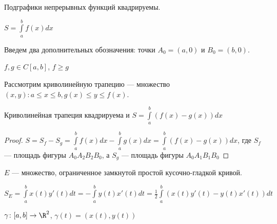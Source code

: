     \begin{Rem}

        Подграфики непрерывных функций квадрируемы.
        
        $S = \int\limits_a^b f(x) dx$
    
    \end{Rem}

   
    Введем два дополнительных обозначения: точки $A_0 = (a, 0)$ и $B_0 = (b, 0)$.

    \begin{assertion}

        $f, g \in C[a,b]$, $f \ge g$

       Рассмотрим криволинейную трапецию --- множество ${(x,y) \colon a \le x \le b, g(x) \le y \le f(x)}$.

       Криволинейная трапеция квадрируема и $S = \int\limits_a^b (f(x)-g(x))dx$

    \end{assertion}

    \begin{proof}

        $S = S_f - S_g = \int\limits_a^b f(x) dx - \int\limits_a^b g(x) dx = \int\limits_a^b (f(x) - g(x)) dx$, 
        где $S_f$ --- площадь фигуры $A_0A_2B_2B_0$, а $S_g$ --- площадь фигуры $A_0A_1B_1B_0$

    \end{proof}

    \begin{theorem}

        $E$ --- множество, ограниченное замкнутой простой кусочно-гладкой кривой.

        $S_E = \int\limits_a^b x(t)y'(t)dt = -\int\limits_a^b y(t)x'(t) dt = \frac{1}{2} \int\limits_a^b (x(t)y'(t) - y(t)x'(t))dt$

        $\gamma \colon [a,b] \rightarrow \R^2$, $\gamma(t) = (x(t), y(t))$

    \end{theorem}

